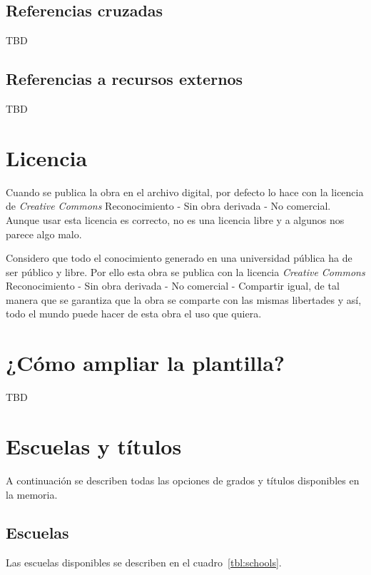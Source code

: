 \documentclass[%
    school=etsisi,%
    type=tfg,%
    degree=61CD,%
]{upm-report}
\begin{document}
\section{Referencias cruzadas}

TBD

\section{Referencias a recursos externos}

TBD

\chapter{Licencia}
\label{ch:licencia}

Cuando se publica la obra en el archivo digital, por defecto lo hace con la licencia de \textit{Creative Commons} Reconocimiento - Sin obra derivada - No comercial. Aunque usar esta licencia es correcto, no es una licencia libre y a algunos nos parece algo malo.

Considero que todo el conocimiento generado en una universidad pública ha de ser público y libre. Por ello esta obra se publica con la licencia \textit{Creative Commons} Reconocimiento - Sin obra derivada - No comercial - Compartir igual, de tal manera que se garantiza que la obra se comparte con las mismas libertades y así, todo el mundo puede hacer de esta obra el uso que quiera.

\appendix

\chapter{¿Cómo ampliar la plantilla?}
\label{ch:ampliar}

TBD

\chapter{Escuelas y títulos}
\label{ch:escuelas-y-titulos}

A continuación se describen todas las opciones de grados y títulos disponibles en la memoria.

\section{Escuelas}

Las escuelas disponibles se describen en el cuadro~\ref{tbl:schools}.
\end{document}

